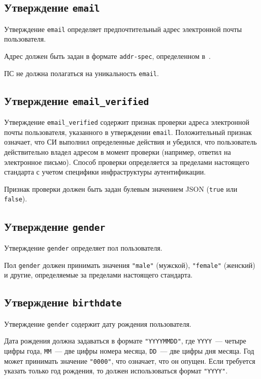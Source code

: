 \subsection{Утверждение \lstinline{email}}\label{CLAIMS.Email}

Утверждение \lstinline{email} определяет предпочтительный адрес электронной 
почты пользователя.

Адрес должен быть задан в формате \lstinline{addr-spec}, определенном 
в~\cite{RFC5322}.

ПС не должна полагаться на уникальность \lstinline{email}.

\subsection{Утверждение \lstinline{email_verified}}\label{CLAIMS.EmailVerified}

Утверждение \lstinline{email_verified} содержит признак проверки адреса
электронной почты пользователя, указанного в утверждении \lstinline{email}.
%
Положительный признак означает, что СИ выполнил определенные действия и
убедился, что пользователь действительно  владел адресом в момент проверки
(например, ответил на электронное письмо).
%
Способ проверки определяется за пределами настоящего стандарта с учетом 
специфики инфраструктуры аутентификации.  

Признак проверки должен быть задан булевым значением JSON
(\lstinline{true} или \lstinline{false}).

\subsection{Утверждение \lstinline{gender}}\label{CLAIMS.Gender}

Утверждение \lstinline{gender} определяет пол пользователя. 

Пол \lstinline{gender} должен принимать значения 
\lstinline{"male"} (мужской), \lstinline{"female"} (женский)
и другие, определяемые за пределами настоящего стандарта.

\subsection{Утверждение \lstinline{birthdate}}\label{CLAIMS.Birthdate}

Утверждение \lstinline{gender} содержит дату рождения пользователя. 

Дата рождения должна задаваться в формате \lstinline{"YYYYMMDD"},
где \lstinline{YYYY}~--- четыре цифры года, \lstinline{MM}~--- две цифры номера 
месяца, \lstinline{DD}~--- две цифры дня месяца.
%
Год может принимать значение \lstinline{"0000"}, что означает, что он опущен. 
%
Если требуется указать только год рождения, то должен использоваться формат 
\lstinline{"YYYY"}. 

